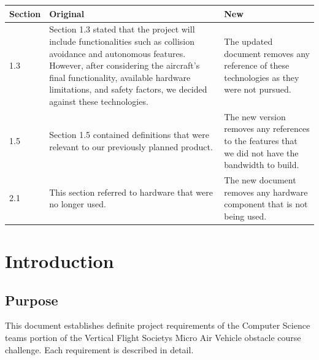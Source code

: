 \documentclass[onecolumn, oneside, letterpaper, draftclsnofoot, 10pt, compsoc]{IEEEtran}
\begin{document}
\begin{titlepage}
\begin{singlespace}
\begin{abstract}
        \noindent
        Oregon State University (OSU) is participating in this year\textquotesingle s Mirco Air Vehicle (MAV) Challenge hosted by the Vertical Flight Society (VFS). The VFS hosts the annual MAV Challenge to attract interest from future scientists and engineers, and to promote vertical flight technology. OSU\textquotesingle s team is comprised of Mechanical Engineers, Electrical and Computer Engineers, and Computer Scientists. This document covers the expected functionality of OSU\textquotesingle s MAV software, developed and written by the team\textquotesingle s Computer Scientists. 
        \end{abstract}
    \end{singlespace}
\end{titlepage}
\newpage
{}
\tableofcontents

\listoffigures
\clearpage

\newpage
\begin{center}
  \begin{tabular}{ | l | p{5cm} | p{5cm} | }
    \hline
    Section & Original & New \\ \hline
    1.3 & Section 1.3 stated that the project will include functionalities such as collision avoidance and autonomous features. However, after considering the aircraft's final functionality, available hardware limitations, and safety factors, we decided against these technologies.  & The updated document removes any reference of these technologies as they were not pursued. \\ \hline
    1.5 & Section 1.5 contained definitions that were relevant to our previously planned product. & The new version removes any references to the features that we did not have the bandwidth to build. \\ \hline
    2.1 & This section referred to hardware that were no longer used. & The new document removes any hardware component that is not being used. \\ \hline
  \end{tabular}
\end{center}
\newpage

\section{Introduction}

\subsection{Purpose}
This document establishes definite project requirements of the Computer Science team\textquotesingle s portion of the Vertical Flight Society\textquotesingle s Micro Air Vehicle obstacle course challenge. Each requirement is described in detail.
\end{document}
